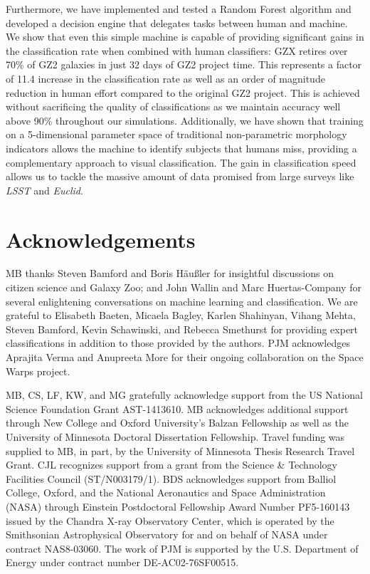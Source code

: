 Furthermore, we have implemented and tested a Random Forest algorithm 
and developed a decision engine that delegates tasks between human and 
machine.  We show that even this simple machine is capable of providing significant 
gains in the classification rate when combined with human classifiers: GZX
 retires over 70\% of GZ2 galaxies in just 32 days of GZ2 project time.  
This represents a factor of 11.4 increase in the classification rate as well as
 an order of magnitude reduction in human effort compared to the original GZ2 project. 
This is achieved without sacrificing the quality of classifications as we maintain 
accuracy well above 90\% throughout our simulations. 
Additionally, we have shown that training on a 5-dimensional parameter space of 
traditional non-parametric morphology indicators allows the machine to identify 
subjects that humans miss, providing  a complementary approach to visual classification. 
The gain in classification speed allows us to tackle the massive amount of data promised
 from large surveys like \textit{LSST} and \textit{Euclid}.
 
 
\section{Acknowledgements}
MB thanks Steven Bamford and Boris H{\"a}u{\ss}ler for insightful discussions on citizen science and Galaxy Zoo; and John Wallin and Marc Huertas-Company for several enlightening conversations on machine learning and classification. 
We are grateful to Elisabeth Baeten, Micaela Bagley, Karlen Shahinyan, Vihang Mehta, Steven Bamford, Kevin Schawinski, and Rebecca Smethurst for providing expert classifications in addition to those provided by the authors. PJM acknowledges Aprajita Verma and Anupreeta More for their ongoing collaboration on the Space Warps project. 

MB, CS, LF, KW, and MG gratefully acknowledge support from the US National Science
Foundation Grant AST-1413610.  MB acknowledges additional support 
through New College and Oxford University's Balzan Fellowship as well as the University
of Minnesota Doctoral Dissertation Fellowship. Travel funding was supplied 
to MB, in part, by the University of Minnesota Thesis Research Travel Grant. CJL recognizes support from a grant from the Science \& Technology Facilities Council (ST/N003179/1). 
BDS acknowledges support from Balliol College, Oxford, and the National Aeronautics and Space Administration (NASA) through Einstein Postdoctoral Fellowship Award Number PF5-160143 issued by the Chandra X-ray Observatory Center, which is operated by the Smithsonian Astrophysical Observatory for and on behalf of NASA under contract NAS8-03060. The work of PJM is supported by the U.S. Department of Energy under contract number DE-AC02-76SF00515.
